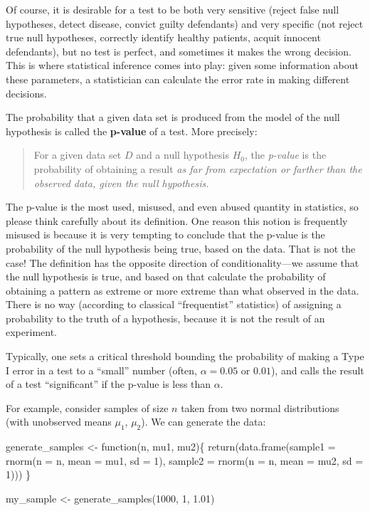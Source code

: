 \documentclass[
  letterpaper,
  DIV=11,
  numbers=noendperiod]{scrreprt}
\newenvironment{Shaded}{\begin{snugshade}}{\end{snugshade}}
\newcommand{\AttributeTok}[1]{\textcolor[rgb]{0.40,0.45,0.13}{#1}}
\newcommand{\ControlFlowTok}[1]{\textcolor[rgb]{0.00,0.23,0.31}{#1}}
\newcommand{\DecValTok}[1]{\textcolor[rgb]{0.68,0.00,0.00}{#1}}
\newcommand{\FloatTok}[1]{\textcolor[rgb]{0.68,0.00,0.00}{#1}}
\newcommand{\FunctionTok}[1]{\textcolor[rgb]{0.28,0.35,0.67}{#1}}
\newcommand{\NormalTok}[1]{\textcolor[rgb]{0.00,0.23,0.31}{#1}}
\newcommand{\OtherTok}[1]{\textcolor[rgb]{0.00,0.23,0.31}{#1}}
\begin{document}
Of course, it is desirable for a test to be both very sensitive (reject
false null hypotheses, detect disease, convict guilty defendants) and
very specific (not reject true null hypotheses, correctly identify
healthy patients, acquit innocent defendants), but no test is perfect,
and sometimes it makes the wrong decision. This is where statistical
inference comes into play: given some information about these
parameters, a statistician can calculate the error rate in making
different decisions.

The probability that a given data set is produced from the model of the
null hypothesis is called the \textbf{p-value} of a test. More
precisely:

\begin{quote}
For a given data set \(D\) and a null hypothesis \(H_0\), the
\emph{p-value} is the probability of obtaining a result \emph{as far
from expectation or farther than the observed data, given the null
hypothesis.}
\end{quote}

The p-value is the most used, misused, and even abused quantity in
statistics, so please think carefully about its definition. One reason
this notion is frequently misused is because it is very tempting to
conclude that the p-value is the probability of the null hypothesis
being true, based on the data. That is not the case! The definition has
the opposite direction of conditionality---we assume that the null
hypothesis is true, and based on that calculate the probability of
obtaining a pattern as extreme or more extreme than what observed in the
data. There is no way (according to classical ``frequentist''
statistics) of assigning a probability to the truth of a hypothesis,
because it is not the result of an experiment.

Typically, one sets a critical threshold bounding the probability of
making a Type I error in a test to a ``small'' number (often,
\(\alpha = 0.05\) or \(0.01\)), and calls the result of a test
``significant'' if the p-value is less than \(\alpha\).

For example, consider samples of size \(n\) taken from two normal
distributions (with unobserved means \(\mu_1\), \(\mu_2\)). We can
generate the data:

\begin{Shaded}
\begin{Highlighting}[]
\NormalTok{generate\_samples }\OtherTok{\textless{}{-}} \ControlFlowTok{function}\NormalTok{(n, mu1, mu2)\{}
  \FunctionTok{return}\NormalTok{(}\FunctionTok{data.frame}\NormalTok{(}\AttributeTok{sample1 =} \FunctionTok{rnorm}\NormalTok{(}\AttributeTok{n =}\NormalTok{ n, }\AttributeTok{mean =}\NormalTok{ mu1, }\AttributeTok{sd =} \DecValTok{1}\NormalTok{),}
               \AttributeTok{sample2 =} \FunctionTok{rnorm}\NormalTok{(}\AttributeTok{n =}\NormalTok{ n, }\AttributeTok{mean =}\NormalTok{ mu2, }\AttributeTok{sd =} \DecValTok{1}\NormalTok{)))}
\NormalTok{\}}

\NormalTok{my\_sample }\OtherTok{\textless{}{-}} \FunctionTok{generate\_samples}\NormalTok{(}\DecValTok{1000}\NormalTok{, }\DecValTok{1}\NormalTok{, }\FloatTok{1.01}\NormalTok{)}
\end{Highlighting}
\end{Shaded}
\end{document}
